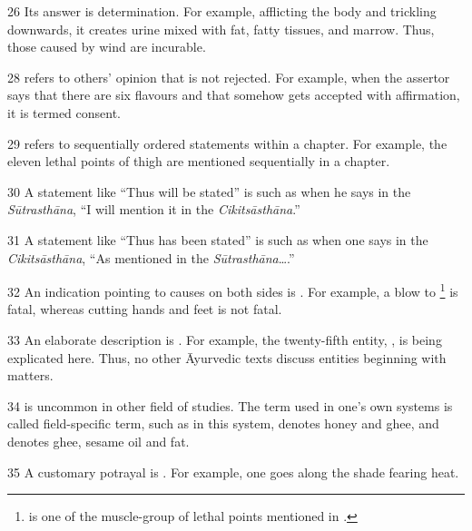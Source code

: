\begin{translation}
\item [26] Its answer is determination. For example, afflicting the body and 
trickling downwards, it creates urine mixed with fat, fatty tissues, and 
marrow. Thus, those caused by wind are incurable. 

\item [28]  refers to others' opinion that is not rejected. For example, when the assertor says that there are six flavours and that somehow gets accepted with affirmation, it is termed consent.

\item [29]  refers to sequentially ordered statements within a chapter. For example, the eleven lethal points of thigh are mentioned sequentially in a chapter.

\item [30] A statement like “Thus will be stated” is  such as when he says in the \emph{Sūtrasthāna}, “I will mention it in 
the \emph{Cikitsāsthāna}.” 

\item [31] A statement like “Thus has been stated” is 
 such as when one says in the 
\emph{Cikitsāsthāna}, “As mentioned in the \emph{Sūtrasthāna}\ldots.” 

\item [32] An indication pointing to causes on both sides is
. For example, a blow to
\footnote{ is one of the
    muscle-group of lethal points mentioned in .}  is fatal,
    whereas cutting hands and feet is not fatal.

\item [33] An elaborate description is . For example, 
the twenty-fifth entity, , is being explicated here. Thus, no 
other Āyurvedic texts discuss  entities beginning with matters. 

\item [34]  is uncommon in other field of 
studies. The term used in one's own systems is called field-specific term, such as 
in this system,  denotes honey and ghee, and 
 denotes ghee, sesame oil and fat. 

\item [35] A customary potrayal is . For example, one goes along the shade fearing heat. 


\end{translation}
